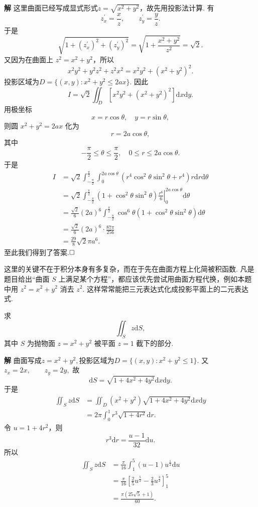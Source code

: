\documentclass{ctexart}
\newenvironment{custom}[1]{\par\noindent \textbf{#1}\quad}{\par\vspace{1em}}
\begin{document}
\begin{custom}{解}
这里曲面已经写成显式形式$z=\sqrt{x^{2}+y^{2}}$，故先用投影法计算. 有
\[
z_{x}^{\prime}=\frac{x}{z},\qquad z_{y}^{\prime}=\frac{y}{z}.
\]
于是
\[
\sqrt{1+(z_{x}^{\prime})^{2}+(z_{y}^{\prime})^{2}}
=\sqrt{1+\frac{x^{2}+y^{2}}{z^{2}}}
=\sqrt{2}.
\]
又因为在曲面上 $z^{2}=x^{2}+y^{2}$，所以
\[
x^{2}y^{2}+y^{2}z^{2}+z^{2}x^{2}
=x^{2}y^{2}+(x^{2}+y^{2})^{2}.
\]
投影区域为$D=\{(x,y):x^{2}+y^{2}\leqslant 2ax\}.$
因此
\[
I=\sqrt{2}\iint_{D}\left[x^{2}y^{2}+(x^{2}+y^{2})^{2}\right]\mathrm{d}x\mathrm{d}y.
\]
用极坐标
\[
x=r\cos\theta,\quad y=r\sin\theta,
\]
则圆 $x^{2}+y^{2}=2ax$ 化为
\[
r=2a\cos\theta,
\]
其中
\[
-\frac{\pi}{2}\leqslant \theta\leqslant \frac{\pi}{2},\quad
0\leqslant r\leqslant 2a\cos\theta.
\]
于是
\[
\begin{aligned}
I
&=\sqrt{2}\int_{-\frac{\pi}{2}}^{\frac{\pi}{2}}
\int_{0}^{2a\cos\theta}
\left(r^{4}\cos^{2}\theta\sin^{2}\theta+r^{4}\right)r\mathrm{d}r\mathrm{d}\theta\\
&=\sqrt{2}\int_{-\frac{\pi}{2}}^{\frac{\pi}{2}}
\left(1+\cos^{2}\theta\sin^{2}\theta\right)
\left.\frac{r^{6}}{6}\right|_{0}^{2a\cos\theta}
\mathrm{d}\theta\\
&=\frac{\sqrt{2}}{6}(2a)^{6}
\int_{-\frac{\pi}{2}}^{\frac{\pi}{2}}
\cos^{6}\theta
\left(1+\cos^{2}\theta\sin^{2}\theta\right)
\mathrm{d}\theta\\
&=\frac{\sqrt{2}}{6}(2a)^{6}
\cdot \frac{87\pi}{256}\\
&=\frac{29}{8}\sqrt{2}\pi a^{6}.
\end{aligned}
\]
至此我们得到了答案.$\hfill{\square}$
\end{custom}

这里的关键不在于积分本身有多复杂，而在于先在曲面方程上化简被积函数. 凡是题目给出“曲面 $S$ 上满足某个方程”，都应该优先尝试用曲面方程代换，例如本题中用 $z^{2}=x^{2}+y^{2}$ 消去 $z^{2}$. 这样常常能把三元表达式化成投影平面上的二元表达式.

\begin{example}
求
\[
\iint_{S}z\mathrm{d}S,
\]
其中 $S$ 为抛物面 $z=x^{2}+y^{2}$ 被平面 $z=1$ 截下的部分.
\end{example}

\begin{custom}{解}
曲面写成$z=x^{2}+y^{2},$投影区域为$D=\{(x,y):x^{2}+y^{2}\leqslant 1\}.$
又
$z_{x}=2x,\qquad z_{y}=2y,$
故
$$
\mathrm{d}S=\sqrt{1+4x^{2}+4y^{2}}\mathrm{d}x\mathrm{d}y.
$$
于是
\[
\begin{aligned}
\iint_{S}z\mathrm{d}S
&=\iint_{D}(x^{2}+y^{2})\sqrt{1+4x^{2}+4y^{2}}\mathrm{d}x\mathrm{d}y\\
&=2\pi\int_{0}^{1}r^{3}\sqrt{1+4r^{2}}\mathrm{d}r.
\end{aligned}
\]
令 $u=1+4r^{2}$，则
\[
r^{3}\mathrm{d}r=\frac{u-1}{32}\mathrm{d}u.
\]
所以
\[
\begin{aligned}
\iint_{S}z\mathrm{d}S
&=\frac{\pi}{16}\int_{1}^{5}(u-1)u^{\frac12}\mathrm{d}u\\
&=\frac{\pi}{16}\left[\frac{2}{5}u^{\frac52}-\frac{2}{3}u^{\frac32}\right]_{1}^{5}\\
&=\frac{\pi(25\sqrt{5}+1)}{60}.
\end{aligned}
\]
\end{custom}
\end{document}
